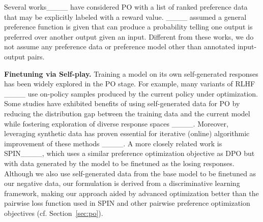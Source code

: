 Several works____ have considered PO with a list of ranked preference data that may be explicitly labeled with a reward value.  ____ assumed a general preference function is given that can produce a probability telling one output is preferred over another output given an input. Different from these works, we do not assume any preference data or preference model other than annotated input-output pairs. %

{\bf Finetuning via Self-play.} Training a model on its own self-generated responses has been widely explored in the PO stage. For example, many variants of RLHF ____ use on-policy samples produced by the current policy under optimization. Some studies have exhibited benefits of using self-generated data for PO by reducing the distribution gap between the training data and the current model while fostering exploration of diverse response spaces ____. Moreover, leveraging synthetic data has proven essential for iterative (online) algorithmic improvement of these methods ____. A more closely related work is SPIN____, which uses a similar preference optimization objective as DPO but with data generated by the model to be finetuned as the losing responses. Although we also use self-generated data from the base model to be finetuned as our negative data, our formulation is derived from a discriminative learning framework, making our approach aided by advanced optimization better than the pairwise loss function used in SPIN and other pairwise preference optimization objectives (cf. Section~\ref{sec:po}). 


